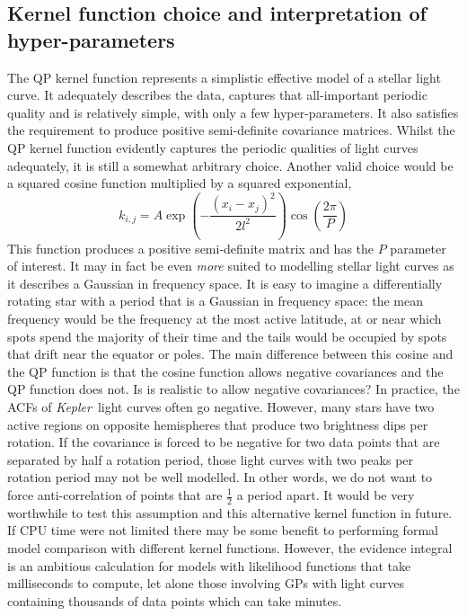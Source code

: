 \documentclass[useAMS, usenatbib, preprint, 12pt]{aastex}
\newcommand{\Kepler}{{\it Kepler}}
\begin{document}
\subsection{Kernel function choice and interpretation of hyper-parameters}
The QP kernel function represents a simplistic effective model of a stellar
light curve.
It adequately describes the data, captures that all-important periodic quality
and is relatively simple, with only a few hyper-parameters.
It also satisfies the requirement to produce positive semi-definite covariance
matrices.
Whilst the QP kernel function evidently captures the periodic qualities of
light curves adequately, it is still a somewhat arbitrary choice.
Another valid choice would be a squared cosine function multiplied by a
squared exponential,
\begin{equation}
k_{i,j} = A \exp \left(-\frac{(x_i - x_j)^2}{2l^2}\right)
\cos\left(\frac{2\pi}{P}\right)
\end{equation}
\label{eq:cos_kernel}
This function produces a positive semi-definite matrix and has the $P$
parameter of interest.
It may in fact be even {\it more} suited to modelling stellar
light curves as it describes a Gaussian in frequency space.
It is easy to imagine a differentially rotating star with a period that is a
Gaussian in frequency space: the mean frequency would be the frequency at the
most active latitude, at or near which spots spend the majority of their time
and the tails would be occupied by spots that drift near the equator or poles.
The main difference between this cosine and the QP function is that the cosine
function allows negative covariances and the QP function does not.
Is is realistic to allow negative covariances?
In practice, the ACFs of \Kepler\ light curves often go negative.
However, many stars have two active regions on opposite hemispheres that
produce two brightness dips per rotation.
If the covariance is forced to be negative for two data points that are
separated by half a rotation period, those light curves with two peaks per
rotation period may not be well modelled.
In other words, we do not want to force anti-correlation of points that are
$\frac{1}{2}$ a period apart.
It would be very worthwhile to test this assumption and this alternative
kernel function in future.
If CPU time were not limited there may be some benefit to performing formal
model comparison with different kernel functions.
However, the evidence integral is an ambitious calculation for models with
likelihood functions that take milliseconds to compute, let alone those
involving GPs with light curves containing thousands of data points which can
take minutes.
\end{document}
